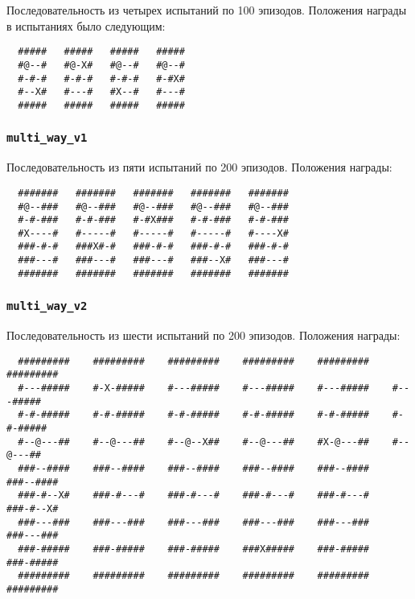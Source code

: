 \documentclass[a4paper]{article}
\begin{document}
Последовательность из четырех испытаний по 100 эпизодов. Положения награды в испытаниях было следующим:


\begin{verbatim}
  #####   #####   #####   #####
  #@--#   #@-X#   #@--#   #@--#
  #-#-#   #-#-#   #-#-#   #-#X#
  #--X#   #---#   #X--#   #---#
  #####   #####   #####   #####
\end{verbatim}

\subsubsection{\texttt{multi\_way\_v1}}

Последовательность из пяти испытаний по 200 эпизодов. Положения награды:

\begin{verbatim}
  #######   #######   #######   #######   #######
  #@--###   #@--###   #@--###   #@--###   #@--###
  #-#-###   #-#-###   #-#X###   #-#-###   #-#-###
  #X----#   #-----#   #-----#   #-----#   #----X#
  ###-#-#   ###X#-#   ###-#-#   ###-#-#   ###-#-#
  ###---#   ###---#   ###---#   ###--X#   ###---#
  #######   #######   #######   #######   #######
\end{verbatim}

\subsubsection{\texttt{multi\_way\_v2}}

Последовательность из шести испытаний по 200 эпизодов. Положения награды:

\begin{verbatim}
  #########    #########    #########    #########    #########    #########
  #---#####    #-X-#####    #---#####    #---#####    #---#####    #---#####
  #-#-#####    #-#-#####    #-#-#####    #-#-#####    #-#-#####    #-#-#####
  #--@---##    #--@---##    #--@--X##    #--@---##    #X-@---##    #--@---##
  ###--####    ###--####    ###--####    ###--####    ###--####    ###--####
  ###-#--X#    ###-#---#    ###-#---#    ###-#---#    ###-#---#    ###-#--X#
  ###---###    ###---###    ###---###    ###---###    ###---###    ###---###
  ###-#####    ###-#####    ###-#####    ###X#####    ###-#####    ###-#####
  #########    #########    #########    #########    #########    #########
\end{verbatim}
\end{document}
